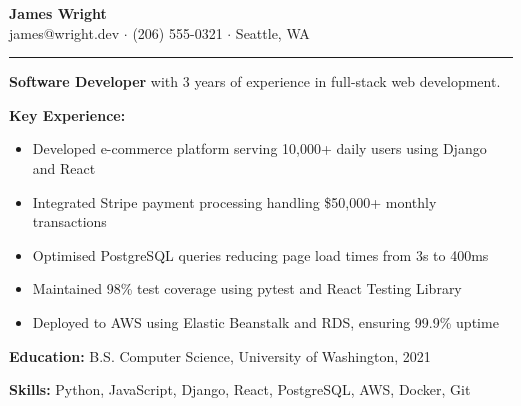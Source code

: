 \documentclass[12pt]{article}
\begin{document}
\begin{center}
  \textbf{\Large James Wright} \\
  james@wright.dev $\cdot$ (206) 555-0321 $\cdot$ Seattle, WA
\end{center}

\vspace{8pt}
\noindent\rule{\textwidth}{0.5pt}
\vspace{4pt}

\noindent\textbf{Software Developer} with 3 years of experience in full-stack web development.

\vspace{8pt}

\noindent\textbf{Key Experience:}
\begin{itemize}
  \item Developed e-commerce platform serving 10,000+ daily users using Django and React
  \item Integrated Stripe payment processing handling \$50,000+ monthly transactions
  \item Optimised PostgreSQL queries reducing page load times from 3s to 400ms
  \item Maintained 98\% test coverage using pytest and React Testing Library
  \item Deployed to AWS using Elastic Beanstalk and RDS, ensuring 99.9\% uptime
\end{itemize}

\vspace{8pt}

\noindent\textbf{Education:} B.S. Computer Science, University of Washington, 2021

\vspace{4pt}

\noindent\textbf{Skills:} Python, JavaScript, Django, React, PostgreSQL, AWS, Docker, Git
\end{document}
